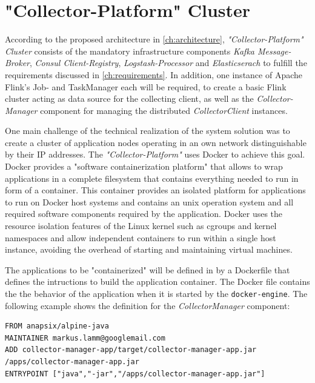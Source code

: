 \section{"Collector-Platform" Cluster}
\label{sec:collector-platform-cluster}

According to the proposed architecture in \autoref{ch:architecture}, \textit{"Collector-Platform" Cluster} consists of the
mandatory infrastructure components \textit{Kafka Message-Broker}, \textit{Consul Client-Registry}, \textit{Logstash-Processor} and
\textit{Elasticserach} to fulfill the requirements discussed in \autoref{ch:requirements}. In addition, one instance of
Apache Flink's Job- and TaskManager each will be required, to create a basic Flink cluster acting as data source for the collecting client,
as well as the \textit{Collector-Manager} component for managing the distributed \textit{CollectorClient} instances.

One main challenge of the technical realization of the system solution was to create a cluster of application nodes operating in an
own network distinguishable by their IP addresses. The \textit{"Collector-Platform"} uses Docker to achieve this goal.
Docker provides a "software containerization platform" that allows to wrap applications in a complete filesystem that contains everything
needed to run in form of a container. This container provides an isolated platform for applications to run on Docker host systems
and contains an unix operation system and all required software components required by the application.
Docker uses the resource isolation features of the Linux kernel such as cgroups and kernel namespaces and allow independent containers
to run within a single host instance, avoiding the overhead of starting and maintaining virtual machines.

The applications to be "containerized" will be defined in by a Dockerfile that defines the intructions to build the application container.
The Docker file contains the the behavior of the application when it is started by the \verb|docker-engine|. The following
example shows the definition for the \textit{CollectorManager} component:

\begin{lstlisting}[caption={Dockerfile "CollectorManager"}, captionpos=b, label={lst:dockerfile}]
FROM anapsix/alpine-java
MAINTAINER markus.lamm@googlemail.com
ADD collector-manager-app/target/collector-manager-app.jar /apps/collector-manager-app.jar
ENTRYPOINT ["java","-jar","/apps/collector-manager-app.jar"]
\end{lstlisting}

